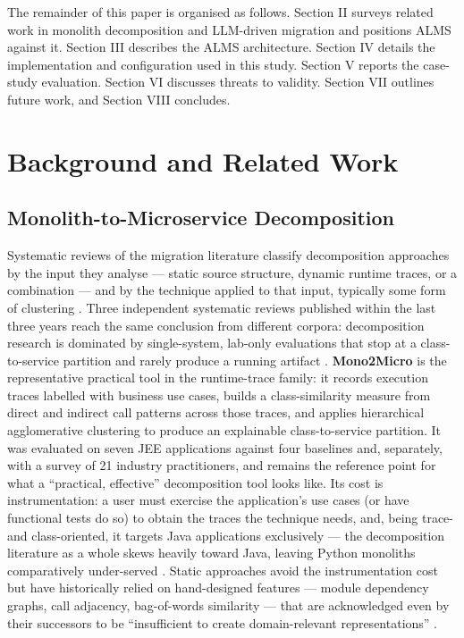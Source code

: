 \documentclass[conference]{IEEEtran}
\begin{document}
The remainder of this paper is organised as follows. Section II surveys related work in monolith decomposition and LLM-driven migration and positions ALMS against it. Section III describes the ALMS architecture. Section IV details the implementation and configuration used in this study. Section V reports the case-study evaluation. Section VI discusses threats to validity. Section VII outlines future work, and Section VIII concludes.

\section{Background and Related Work}

\subsection{Monolith-to-Microservice Decomposition}

Systematic reviews of the migration literature classify decomposition approaches by the input they analyse --- static source structure, dynamic runtime traces, or a combination --- and by the technique applied to that input, typically some form of clustering \cite{hassan2024,saucedo2025,abgaz2023}. Three independent systematic reviews published within the last three years reach the same conclusion from different corpora: decomposition research is dominated by single-system, lab-only evaluations that stop at a class-to-service partition and rarely produce a running artifact \cite{hassan2024,saucedo2025,abgaz2023}. \textbf{Mono2Micro} \cite{kalia2021} is the representative practical tool in the runtime-trace family: it records execution traces labelled with business use cases, builds a class-similarity measure from direct and indirect call patterns across those traces, and applies hierarchical agglomerative clustering to produce an explainable class-to-service partition. It was evaluated on seven JEE applications against four baselines and, separately, with a survey of 21 industry practitioners, and remains the reference point for what a ``practical, effective'' decomposition tool looks like. Its cost is instrumentation: a user must exercise the application's use cases (or have functional tests do so) to obtain the traces the technique needs, and, being trace- and class-oriented, it targets Java applications exclusively --- the decomposition literature as a whole skews heavily toward Java, leaving Python monoliths comparatively under-served \cite{saucedo2025}. Static approaches avoid the instrumentation cost but have historically relied on hand-designed features --- module dependency graphs, call adjacency, bag-of-words similarity --- that are acknowledged even by their successors to be ``insufficient to create domain-relevant representations'' \cite{sellami2025}.
\end{document}
